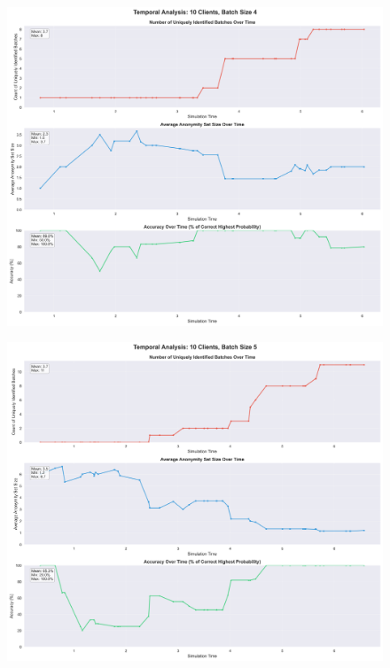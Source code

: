 \documentclass[twocolumn]{article}
\begin{document}
\begin{figure}[!htb]
\centering
\includegraphics[width=\textwidth]{diagrams/temporal_analysis_10_4.png}
\label{fig:temporal_analysis_10_4}
\end{figure}

\begin{figure}[!htb]
\centering
\includegraphics[width=\textwidth]{diagrams/temporal_analysis_10_5.png}
\label{fig:temporal_analysis_10_5}
\end{figure}
\end{document}

